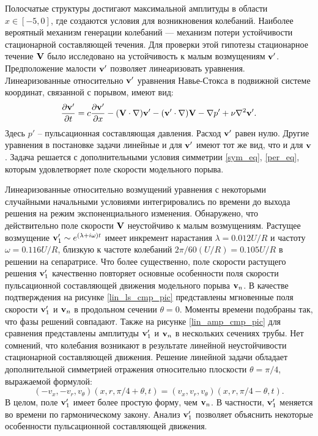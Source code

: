 Полосчатые структуры достигают максимальной амплитуды в области $x\in[-5,0]$, где создаются условия для возникновения колебаний. Наиболее вероятный механизм генерации колебаний --- механизм потери устойчивости стационарной составляющей течения. Для проверки этой гипотезы стационарное течение $\mathbf{V}$ было исследовано на устойчивость к малым возмущениям $\mathbf{v}'$. Предположение малости $\mathbf{v}'$ позволяет линеаризовать уравнения. Линеаризованные относительно $\mathbf{v}'$ уравнения Навье-Стокса в подвижной системе координат, связанной с порывом, имеют вид:
\begin{equation} \label{lin_eq}
\frac{\partial \mathbf{v}'}{\partial t} = c \frac{\partial \mathbf{v}'}{\partial x} - (\mathbf{V} \cdot \nabla) \mathbf{v}' - (\mathbf{v}' \cdot \nabla) \mathbf{V} - \nabla p' + \nu \nabla^2 \mathbf{v}'. 
\end{equation}
Здесь $p'$ -- пульсационная составляющая давления. Расход $\mathbf{v}'$ равен нулю. Другие уравнения в постановке задачи линейные и для $\mathbf{v}'$ имеют тот же вид, что и для $\mathbf{v}$. Задача решается с дополнительными условия симметрии \eqref{sym_eq}, \eqref{per_eq}, которым удовлетворяет поле скорости модельного порыва. 

Линеаризованные относительно возмущений уравнения с некоторыми случайными начальными условиями интегрировались по времени до выхода решения на режим экспоненциального изменения. Обнаружено, что действительно поле скорости $\mathbf{V}$ неустойчиво к малым возмущениям. Растущее возмущение $\mathbf{v}'_1 \sim e^{(\lambda+i\omega)t}$ имеет инкремент нарастания $\lambda=0.012U/R$ и частоту $\omega=0.116U/R$, близкую к частоте колебаний $2\pi/60(U/R)=0.105U/R$ в решении на сепаратрисе. Что более существенно, поле скорости растущего решения $\mathbf{v}'_1$ качественно повторяет основные особенности поля скорости пульсационной составляющей движения модельного порыва $\mathbf{v}_n$. В качестве подтверждения на рисунке \ref{lin_ls_cmp_pic} представлены мгновенные поля скорости $\mathbf{v}'_1$ и $\mathbf{v}_n$ в продольном сечении $\theta = 0$. Моменты времени подобраны так, что фазы решений совпадают. Также на рисунке \ref{lin_amp_cmp_pic} для сравнения представлены амплитуды $\mathbf{v}_1'$ и $\mathbf{v}_n$ в нескольких сечениях трубы. Нет сомнений, что колебания возникают в результате линейной неустойчивости стационарной составляющей движения. Решение линейной задачи обладает дополнительной симметрией отражения относительно плоскости $\theta = \pi/4$, выражаемой формулой:
\begin{equation} \label{dop_sym_eq}
(-v_x, -v_r, v_\theta)(x, r, \pi/4 + \theta, t) = (v_x, v_r, v_\theta)(x, r, \pi/4 - \theta, t). 
\end{equation} 
В целом, поле $\mathbf{v}'_1$ имеет более простую форму, чем $\mathbf{v}_n$. В частности, $\mathbf{v}'_1$ меняется во времени по гармоническому закону. Анализ $\mathbf{v}'_1$ позволяет объяснить некоторые особенности пульсационной составляющей движения. 

